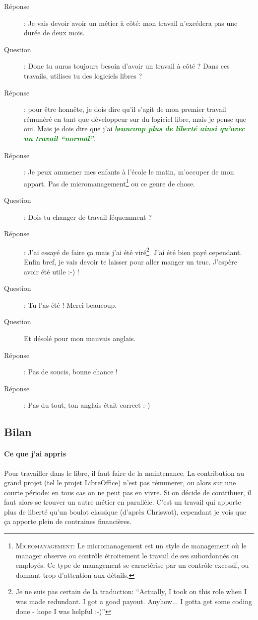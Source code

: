 \documentclass[a4paper,12pt, draft]{report}
\newcommand{\goodPoint}[1]{\textcolor{green}{\textbf{\textit{#1}}}}
\begin{document}
\begin{description}
\item [Réponse]:  Je vais devoir avoir un métier à côté: mon travail n'excédera pas une durée de deux mois. 
\item [Question]:  Donc tu auras toujours besoin d'avoir un travail à côté ? Dans ces travails, utilises tu des logiciels libres ?
\item [Réponse]:  pour être honnête, je dois dire qu'il s'agit de mon premier travail rémunéré en tant que développeur sur du logiciel libre, mais je pense que oui. Mais je dois dire que j'ai \goodPoint{beaucoup plus de liberté ainsi qu'avec un travail ``normal''}.
\item [Réponse]:  Je peux ammener mes enfants à l'école le matin, m'occuper de mon appart. Pas de micromanagement\footnote{\textsc{Micromanagement}: Le micromanagement est un style de management où le manager observe ou contrôle étroitement le travail de ses subordonnés ou employés. Ce type de management se caractérise par un contrôle excessif, ou donnant trop d'attention aux détails.} ou ce genre de chose.
\item [Question]:  Dois tu changer de travail féquemment ?
\item [Réponse]:  J'ai essayé de faire ça mais j'ai été viré\footnote{Je ne suis pas certain de la traduction: ``Actually, I took on this role when I was made redundant. I got a good payout. Anyhow... I gotta get some coding done - hope I was helpful :-)''}. J'ai été bien payé cependant. Enfin bref, je vais devoir te laisser pour aller manger un truc. J'espère avoir été utile :-) !
\item [Question]:  Tu l'as été ! Merci beaucoup.
\item [Question] Et désolé pour mon mauvais anglais.
\item [Réponse]:  Pas de soucis, bonne chance !
\item [Réponse]:  Pas du tout, ton anglais était correct :-)

\end{description}





\subsection{Bilan}
\paragraph{Ce que j'ai appris}
Pour travailler dans le libre, il faut faire de la maintenance.
La contribution au grand projet (tel le projet LibreOffice) n'est pas rémunerer, ou alors sur une courte période: en tous cas on ne peut pas en vivre. Si on décide de contribuer, il faut alors se trouver un autre métier en parallèle.
C'est un travail qui apporte plus de liberté qu'un boulot classique (d'après Chriswot), cependant je vois que ça apporte plein de contraines financières.
\end{document}
